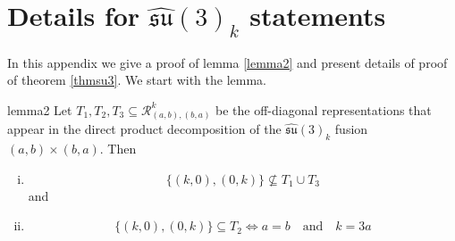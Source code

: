 \documentclass[a4paper,11pt]{article}
\theoremstyle{plain}
\theoremstyle{definition}
\newcommand{\aff}{\widehat{\mathfrak{su}}(3)_k}
\begin{document}
\section{Details for \texorpdfstring{$\aff$}{affine } statements } \label{appendix1}

In this appendix we give a proof of lemma \ref{lemma2} and present details of proof of theorem \ref{thmsu3}. We start with the lemma.
\begin{replemma}{lemma2}
    Let $T_1,T_2,T_3 \subseteq \mathcal{R}_{(a,b),(b,a)}^k$ be the off-diagonal representations that appear in the direct product decomposition of the  $\aff$ fusion $(a,b)\times (b,a)$. Then 
   \begin{enumerate}[i),wide, labelwidth=!, labelindent=0pt]\item \begin{equation}
        \{(k,0),(0,k)\}  \nsubseteq T_1\cup T_3
    \end{equation}
    and \item
    \begin{equation}
          \{(k,0),(0,k)\}  \subseteq T_2 \Longleftrightarrow a=b \quad \text{and}\quad k=3a
    \end{equation}
    \end{enumerate}
\end{replemma}
\end{document}
